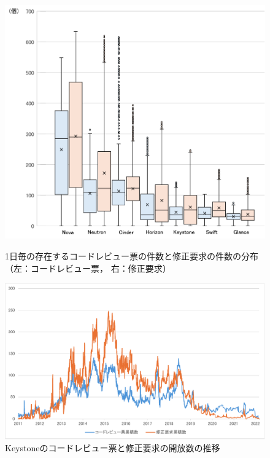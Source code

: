\documentclass[submit,techrep,noauthor]{ipsj}
\begin{document}
\begin{figure}[t]
\centerline{\includegraphics[width=1.0\linewidth]{Kawasaki_fig/task_dist.pdf}}
\caption{1日毎の存在するコードレビュー票の件数と修正要求の件数の分布（左：コードレビュー票， 右：修正要求）}
\label{fig:task_dist}

\vspace{2mm}

\centerline{\includegraphics[width=1.0\linewidth]{Kawasaki_fig/task_trans.pdf}}
\caption{Keystoneのコードレビュー票と修正要求の開放数の推移}
\label{fig:task_trans}
\end{figure}

\end{document}
